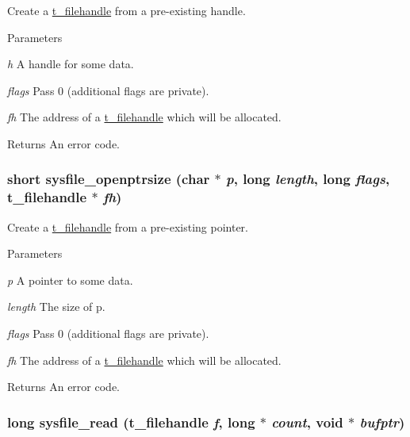 Create a \hyperlink{group__files_gafcb776aa74d514754e83b30995b5a5d1}{t\_\-filehandle} from a pre-\/existing handle. 
\begin{DoxyParams}{Parameters}
\item[{\em h}]A handle for some data. \item[{\em flags}]Pass 0 (additional flags are private). \item[{\em fh}]The address of a \hyperlink{group__files_gafcb776aa74d514754e83b30995b5a5d1}{t\_\-filehandle} which will be allocated. \end{DoxyParams}
\begin{DoxyReturn}{Returns}
An error code. 
\end{DoxyReturn}
\hypertarget{group__files_ga41536c47218a2e623777cab20a6cd3d9}{
\subsubsection[{sysfile\_\-openptrsize}]{\setlength{\rightskip}{0pt plus 5cm}short sysfile\_\-openptrsize (char $\ast$ {\em p}, \/  long {\em length}, \/  long {\em flags}, \/  {\bf t\_\-filehandle} $\ast$ {\em fh})}}
\label{group__files_ga41536c47218a2e623777cab20a6cd3d9}


Create a \hyperlink{group__files_gafcb776aa74d514754e83b30995b5a5d1}{t\_\-filehandle} from a pre-\/existing pointer. 
\begin{DoxyParams}{Parameters}
\item[{\em p}]A pointer to some data. \item[{\em length}]The size of p. \item[{\em flags}]Pass 0 (additional flags are private). \item[{\em fh}]The address of a \hyperlink{group__files_gafcb776aa74d514754e83b30995b5a5d1}{t\_\-filehandle} which will be allocated. \end{DoxyParams}
\begin{DoxyReturn}{Returns}
An error code. 
\end{DoxyReturn}
\hypertarget{group__files_gae1ca61adcbe2234246d15bc7d22c4794}{
\subsubsection[{sysfile\_\-read}]{\setlength{\rightskip}{0pt plus 5cm}long sysfile\_\-read ({\bf t\_\-filehandle} {\em f}, \/  long $\ast$ {\em count}, \/  void $\ast$ {\em bufptr})}}
\label{group__files_gae1ca61adcbe2234246d15bc7d22c4794}


